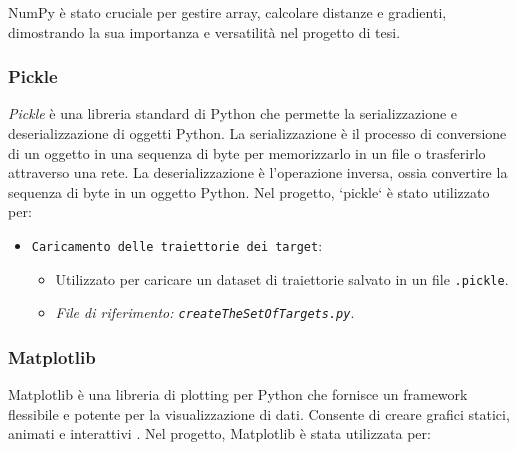 \documentclass[twoside]{article}
\begin{document}
NumPy è stato cruciale per gestire array, calcolare distanze e gradienti, dimostrando la sua importanza e versatilità nel progetto di tesi.

\subsubsection{Pickle}

\textit{Pickle} è una libreria standard di Python che permette la serializzazione e deserializzazione di oggetti Python. La serializzazione è il processo di conversione di un oggetto in una sequenza di byte per memorizzarlo in un file o trasferirlo attraverso una rete. La deserializzazione è l'operazione inversa, ossia convertire la sequenza di byte in un oggetto Python. Nel progetto, `pickle` è stato utilizzato per:

\begin{itemize}
    \item \verb|Caricamento delle traiettorie dei target|:
    \begin{itemize}
        \item Utilizzato per caricare un dataset di traiettorie salvato in un file \texttt{.pickle}.
        \item \textit{File di riferimento: \texttt{createTheSetOfTargets.py}}.
    \end{itemize}
\end{itemize}

\subsubsection{Matplotlib}

Matplotlib è una libreria di plotting per Python che fornisce un framework flessibile e potente per la visualizzazione di dati. Consente di creare grafici statici, animati e interattivi \cite{Hunter:2007}. Nel progetto, Matplotlib è stata utilizzata per:
\end{document}
